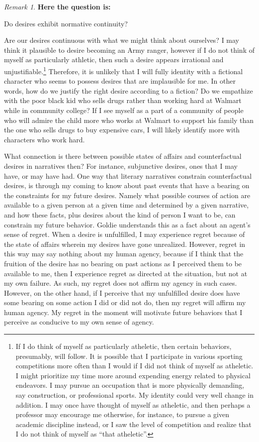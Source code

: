 \documentclass[
  12pt,
]{book}
\theoremstyle{definition}
\theoremstyle{definition}
\theoremstyle{definition}
\theoremstyle{definition}
\theoremstyle{remark}
\newtheorem*{remark}{Remark}
\begin{document}
\begin{remark}
\textbf{Here the question is:}

Do desires exhibit normative continuity?
\end{remark}

Are our desires continuous with what we might think about ourselves? I may think it plausible to desire becoming an Army ranger, however if I do not think of myself as particularly athletic, then such a desire appears irrational and unjustifiable.\footnote{If I do think of myself as particularly atheletic, then certain behaviors, presumably, will follow. It is possible that I participate in various sporting competitions more often than I would if I did not think of myself as atheletic. I might prioritize my time more around expending energy related to physical endeavors. I may pursue an occupation that is more physically demanding, say construction, or professional sports. My identity could very well change in addition. I may once have thought of myself as atheletic, and then perhaps a professor may encourage me otherwise, for instance, to pursue a given academic discipline instead, or I saw the level of competition and realize that I do not think of myself as ``that atheletic''.} Therefore, it is unlikely that I will fully identity with a fictional character who seems to possess desires that are implausible for me. In other words, how do we justify the right desire according to a fiction? Do we empathize with the poor black kid who sells drugs rather than working hard at Walmart while in community college? If I see myself as a part of a community of people who will admire the child more who works at Walmart to support his family than the one who sells drugs to buy expensive cars, I will likely identify more with characters who work hard.

What connection is there between possible states of affairs and counterfactual desires in narratives then? For instance, subjunctive desires, ones that I may have, or may have had. One way that literary narratives constrain counterfactual desires, is through my coming to know about past events that have a bearing on the constraints for my future desires. Namely what possible courses of action are available to a given person at a given time and determined by a given narrative, and how these facts, plus desires about the kind of person I want to be, can constrain my future behavior. Goldie understands this as a fact about an agent's sense of regret. When a desire is unfulfilled, I may experience regret because of the state of affairs wherein my desires have gone unrealized. However, regret in this way may say nothing about my human agency, because if I think that the fruition of the desire has no bearing on past actions as I perceived them to be available to me, then I experience regret as directed at the situation, but not at my own failure. As such, my regret does not affirm my agency in such cases. However, on the other hand, if I perceive that my unfulfilled desire does have some bearing on some action I did or did not do, then my regret will affirm my human agency. My regret in the moment will motivate future behaviors that I perceive as conducive to my own sense of agency.
\end{document}

